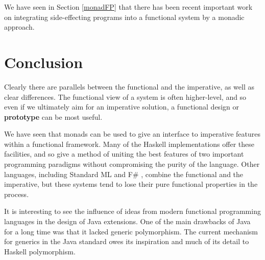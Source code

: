We have seen in Section \ref{monadFP} that there has been recent important
work on integrating side-effecting programs into a functional system by a
monadic approach.

\section*{Conclusion}

Clearly there are parallels between the functional and the imperative, as
well as clear differences. The functional view of a system is often
higher-level, and so even if we ultimately aim for an imperative solution, a
functional design  or \textbf{prototype\/} can be most useful.

We have seen that monads can be used to give an interface to 
imperative features within a functional framework. Many of the Haskell
implementations offer these facilities, and so give a method of uniting the
best features of two important programming paradigms without compromising the
purity of the language. Other languages,
including Standard ML \cite{defsml} and F\# \cite{Fsharp}, combine the functional and the imperative, but
these systems tend to lose their pure functional properties in the process.

It is interesting to see the influence of ideas from modern functional
programming languages in the design of Java extensions. One of the main
drawbacks of Java for a long time was that it lacked generic polymorphism. The current 
mechanism for generics in the Java standard owes its inspiration and much of its detail to Haskell polymorphism.



%
